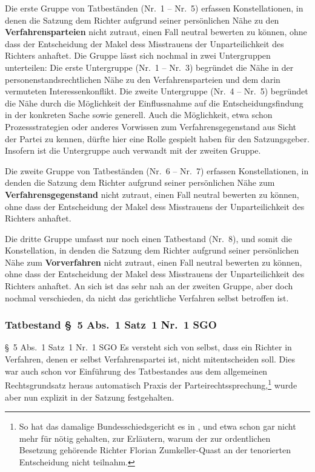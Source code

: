 Die erste Gruppe von Tatbeständen (Nr.~1 -- Nr.~5) erfassen Konstellationen, in denen die Satzung dem Richter aufgrund seiner persönlichen Nähe zu den \textbf{Verfahrensparteien} nicht zutraut, einen Fall neutral bewerten zu können, ohne dass der Entscheidung der Makel dess Misstrauens der Unparteilichkeit des Richters anhaftet.
Die Gruppe lässt sich nochmal in zwei Untergruppen unterteilen:
Die erste Untergruppe (Nr.~1 -- Nr.~3) begründet die Nähe in der personenstandsrechtlichen Nähe zu den Verfahrensparteien und dem darin vermuteten Interessenkonflikt.
Die zweite Untergruppe (Nr.~4 -- Nr.~5) begründet die Nähe durch die Möglichkeit der Einflussnahme auf die Entscheidungsfindung in der konkreten Sache sowie generell.
Auch die Möglichkeit, etwa schon Prozessstrategien oder anderes Vorwissen zum Verfahrensgegenstand aus Sicht der Partei zu kennen, dürfte hier eine Rolle gespielt haben für den Satzungsgeber.
Insofern ist die Untergruppe auch verwandt mit der zweiten Gruppe.

Die zweite Gruppe von Tatbeständen (Nr.~6 -- Nr.~7) erfassen Konstellationen, in denden die Satzung dem Richter aufgrund seiner persönlichen Nähe zum \textbf{Verfahrensgegenstand} nicht zutraut, einen Fall neutral bewerten zu können, ohne dass der Entscheidung der Makel dess Misstrauens der Unparteilichkeit des Richters anhaftet.

Die dritte Gruppe umfasst nur noch einen Tatbestand (Nr.~8), und somit die Konstellation, in denden die Satzung dem Richter aufgrund seiner persönlichen Nähe zum \textbf{Vorverfahren} nicht zutraut, einen Fall neutral bewerten zu können, ohne dass der Entscheidung der Makel dess Misstrauens der Unparteilichkeit des Richters anhaftet.
An sich ist das sehr nah an der zweiten Gruppe, aber doch nochmal verschieden, da nicht das gerichtliche Verfahren selbst betroffen ist.

\subsubsection{Tatbestand \S~5 Abs.~1 Satz~1 Nr.~1 SGO}
\label{Zusammensetzung:Spruchkoerper:Befangenheitsvermutung:Nr1}
\S~5 Abs.~1 Satz~1 Nr.~1 SGO
Es versteht sich von selbst, dass ein Richter in Verfahren, denen er selbst Verfahrenspartei ist, nicht mitentscheiden soll.
Dies war auch schon vor Einführung des Tatbestandes aus dem allgemeinen Rechtsgrundsatz heraus automatisch Praxis der Parteirechtssprechung,\footnote{So hat das damalige Bundesschiedsgericht es in \cite{BSG3014HS}, \cite{BSG4414HS} und \cite{BSG3215HS} etwa schon gar nicht mehr für nötig gehalten, zur Erläutern, warum der zur ordentlichen Besetzung gehörende Richter Florian Zumkeller-Quast an der tenorierten Entscheidung nicht teilnahm.} wurde aber nun explizit in der Satzung festgehalten.

